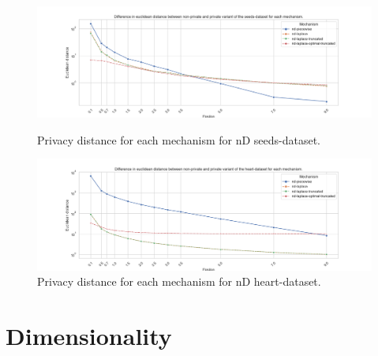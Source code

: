 %


\begin{figure}[H]
    \centering
    \begin{minipage}[c]{0.80\textwidth}
        \includegraphics[width=1\textwidth]{Results/RQ2-nd/seeds-dataset/privacy_distance_plot.png}
        \caption{Privacy distance for each mechanism for nD seeds-dataset.}
        \label{fig:privacy_seeds-dataset_comparison_nd_privacy_distance_plot}
    \end{minipage}
    \begin{minipage}[c]{0.80\textwidth}
        \includegraphics[width=1\textwidth]{Results/RQ2-nd/heart-dataset/privacy_distance_plot.png}
        \caption{Privacy distance for each mechanism for nD heart-dataset.}
        \label{fig:privacy_heart-dataset_comparison_nd_privacy_distance_plot}
    \end{minipage}
\end{figure}

\newpage
\section{Dimensionality}
